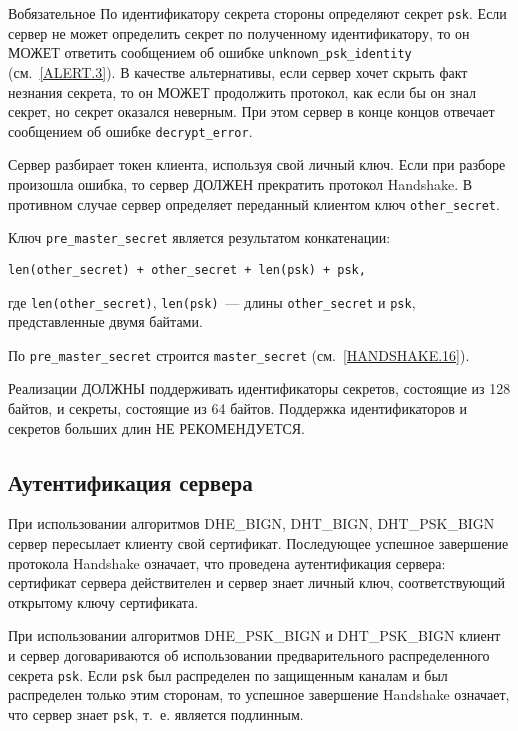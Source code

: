 \begin{appendix}{В}{обязательное}
По идентификатору секрета стороны определяют секрет \lstinline{psk}. Если сервер не 
может определить секрет по полученному идентификатору, то он МОЖЕТ 
ответить сообщением об ошибке \lstinline{unknown_psk_identity} 
(см.~\ref{ALERT.3}). В качестве альтернативы, если сервер хочет скрыть 
факт незнания секрета, то он МОЖЕТ продолжить протокол, как если бы он 
знал секрет, но секрет оказался неверным. При этом сервер в конце концов 
отвечает сообщением об ошибке \lstinline{decrypt_error}. 

Сервер разбирает токен клиента, используя свой личный ключ. Если при 
разборе произошла ошибка, то сервер ДОЛЖЕН прекратить протокол Handshake. 
В противном случае сервер определяет переданный клиентом ключ 
\lstinline{other_secret}. 

Ключ \lstinline{pre_master_secret} является результатом конкатенации:
\begin{lstlisting}
len(other_secret) + other_secret + len(psk) + psk,
\end{lstlisting}
где \lstinline{len(other_secret)}, \lstinline{len(psk)}~--- длины 
\lstinline{other_secret} и \lstinline{psk}, представленные двумя байтами. 

По \lstinline{pre_master_secret} строится \lstinline{master_secret} 
(см.~\ref{HANDSHAKE.16}). 

Реализации ДОЛЖНЫ поддерживать идентификаторы секретов, состоящие из 128 
байтов, и секреты, состоящие из 64 байтов. Поддержка идентификаторов и 
секретов больших длин НЕ РЕКОМЕНДУЕТСЯ. 

\label{BSUITES.3}

\subsection{Аутентификация сервера}\label{BSUITES.3.1}

При использовании алгоритмов DHE\_BIGN, DHT\_BIGN, DHT\_PSK\_BIGN сервер 
пересылает клиенту свой сертификат. Последующее успешное завершение 
протокола Handshake означает, что проведена аутентификация сервера: 
сертификат сервера действителен и сервер знает личный ключ, 
соответствующий открытому ключу сертификата. 

При использовании алгоритмов DHE\_PSK\_BIGN и DHT\_PSK\_BIGN клиент и
сервер договариваются об использовании предварительного распределенного
секрета \lstinline{psk}. Если \lstinline{psk} был распределен по защищенным
каналам и был распределен только этим сторонам, то успешное завершение
Handshake означает, что сервер знает \lstinline{psk}, т.~е.
является подлинным.


\end{appendix}
